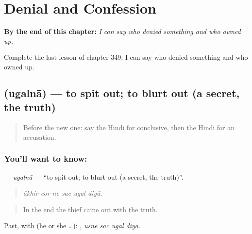 
\chapter{Denial and Confession}
\label{ch:hi-denial-and-confession}

\begin{chapteropening}
\textbf{By the end of this chapter:} \emph{I can say who denied something and who owned up.}

Complete the last lesson of chapter 349: I can say who denied something and who owned up.
\end{chapteropening}

\section[\texorpdfstring{\hi{उगलना} (ugalnā)}{उगलना (ugalnā)}]{ (ugalnā) — to spit out; to blurt out (a secret, the truth)}

\label{lesson:HI-C349-ugalna}



\begin{quote}
Before the new one: say the Hindi for conclusive, then the Hindi for an accusation.
\end{quote}

\subsection*{You'll want to know: }
\textbf{} — \emph{ugalnā} — \textquotedblleft{}to spit out; to blurt out (a secret, the truth)\textquotedblright{}.

\begin{quote}
     
\end{quote}

\begin{quote}
\emph{ākhir cor ne sac ugal diyā.}
\end{quote}

\begin{quote}
In the end the thief came out with the truth.
\end{quote}

Past, with  (he or she …):    , \emph{usne sac ugal diyā}.

